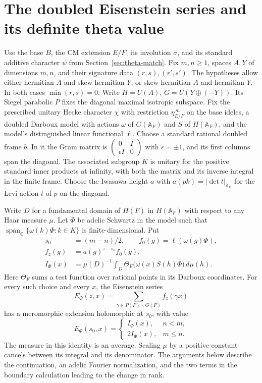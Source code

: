 \section{The doubled Eisenstein series and its definite theta value}
\label{sec:sw-boundary}

Use the base \(B\), the CM extension \(E/F\), its involution \(\sigma\),
and its standard additive character \(\psi\) from
Section~\ref{sec:theta-match}. Fix \(m,n\geq1\), spaces \(A,Y\)
of dimensions \(m,n\), and their signature data \((r,s),(r',s')\).
The hypotheses allow either hermitian \(A\) and skew-hermitian \(Y\),
or skew-hermitian \(A\) and hermitian \(Y\). In both cases
\(\min(r,s)=0\). Write \(H=U(A)\), \(G=U(Y\oplus(-Y))\).
Its Siegel parabolic \(P\) fixes the diagonal maximal isotropic
subspace. Fix the prescribed unitary Hecke character \(\chi\) with
restriction \(\eta_{E/F}^{\,m}\) on the base ideles, a doubled
Darboux model with actions \(\omega\) of \(G(\mathbb A_F)\) and
\(S\) of \(H(\mathbb A_F)\), and the model's distinguished linear
functional \(\ell\). Choose a standard rational doubled frame \(b\).
In it the Gram matrix is
\(\left(\begin{smallmatrix}0&I\\ \epsilon I&0\end{smallmatrix}\right)\)
with \(\epsilon=\pm1\), and its first columns span the diagonal.
The associated subgroup \(K\) is unitary for the positive standard
inner products at infinity, with both the matrix and its inverse
integral in the finite frame. Choose the Iwasawa height \(a\) with
\(a(pk)=|\det t|_{\mathbb A_E}\) for the Levi action \(t\) of \(p\)
on the diagonal.

Write \(D\) for a fundamental domain of \(H(F)\) in
\(H(\mathbb A_F)\) with respect to any Haar measure \(\mu\).
Let \(\Phi\) be adelic Schwartz in the model such that
\(\operatorname{span}_{\mathbb C}\{\omega(k)\Phi:k\in K\}\)
is finite-dimensional. Put
\begin{align*}
 s_0&=(m-n)/2,\qquad f_0(g)=\ell(\omega(g)\Phi),\\
 f_z(g)&=a(g)^{z-s_0}f_0(g),\\
 I_\Phi(x)&=\mu(D)^{-1}\int_D
     \Theta_F\bigl(\omega(x)S(h)\Phi\bigr)\,d\mu(h).
\end{align*}
Here \(\Theta_F\) sums a test function over rational points in its
Darboux coordinates. For every such choice and every \(x\),
the Eisenstein series
\[
 E_\Phi(z,x)=\sum_{\gamma\in P(F)\backslash G(F)} f_z(\gamma x)
\]
has a meromorphic extension holomorphic at \(s_0\), with value
\begin{equation}
 E_\Phi(s_0,x)=
 \begin{cases} I_\Phi(x),& n<m,\\ 2I_\Phi(x),&m\leq n.\end{cases}
 \label{eq:sw-def-value}
\end{equation}
The measure in this identity is an average. Scaling \(\mu\) by a
positive constant cancels between its integral and its denominator.
The arguments below describe the continuation, an adelic Fourier
normalization, and the two terms in the boundary calculation leading
to the change in rank.

